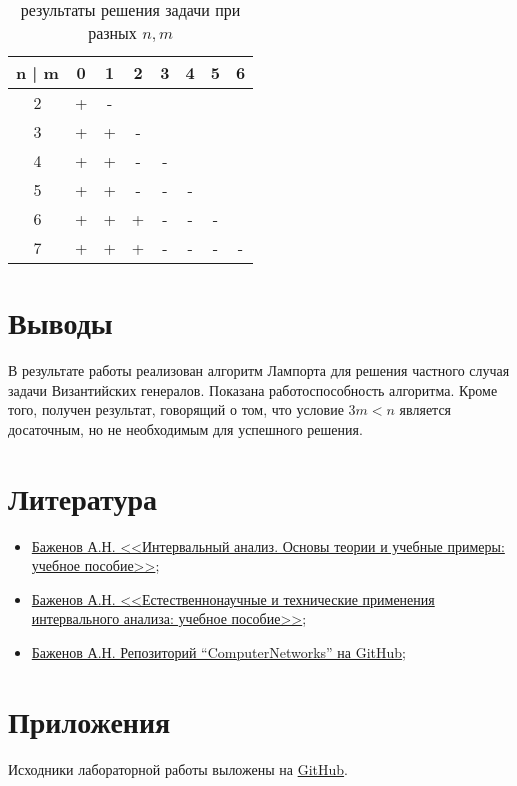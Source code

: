 \documentclass[a4paper,12pt]{article}
\begin{document}
\begin{table}[H]
  \caption{результаты решения задачи при разных $n, m$}
  \begin{tabular}{| c | c | c | c | c | c | c | c |}
    \hline
    n | m & 0 & 1 & 2 & 3 & 4 & 5 & 6 \\
    \hline
    2 & + & - & & & & &  \\
    \hline
    3 & + & + & - & & & & \\
    \hline
    4 & + & + & - & - & & & \\
    \hline
    5 & + & + & - & - & - & & \\
    \hline
    6 & + & + & + & - & - & - & \\
    \hline
    7 & + & + & + & - & - & - & - \\
    \hline
  \end{tabular}
  \centering
\end{table}

\section{Выводы}
\quad В результате работы реализован алгоритм Лампорта для решения частного
случая задачи Византийских генералов. Показана работоспособность алгоритма.
Кроме того, получен результат, говорящий о том, что условие $ 3m < n $ является
досаточным, но не необходимым для успешного решения.

\section{Литература}
\begin{itemize}
  \item \href{https://elib.spbstu.ru/dl/2/s20-76.pdf/info}{Баженов А.Н.
    <<Интервальный анализ. Основы теории и учебные примеры: учебное пособие>>};
  \item \href{https://elib.spbstu.ru/dl/5/tr/2021/tr21-169.pdf/info}{Баженов
      А.Н. <<Естественнонаучные и технические применения интервального анализа:
    учебное пособие>>};
  \item \href{https://github.com/AlexanderBazhenov/ComputerNetworks}{Баженов
    А.Н. Репозиторий ``ComputerNetworks'' на GitHub};
\end{itemize}

\section{Приложения}
\quad Исходники лабораторной работы выложены на
\href{https://github.com/MeShootIn/computer-networks/tree/lab-3}{GitHub}.
\end{document}
